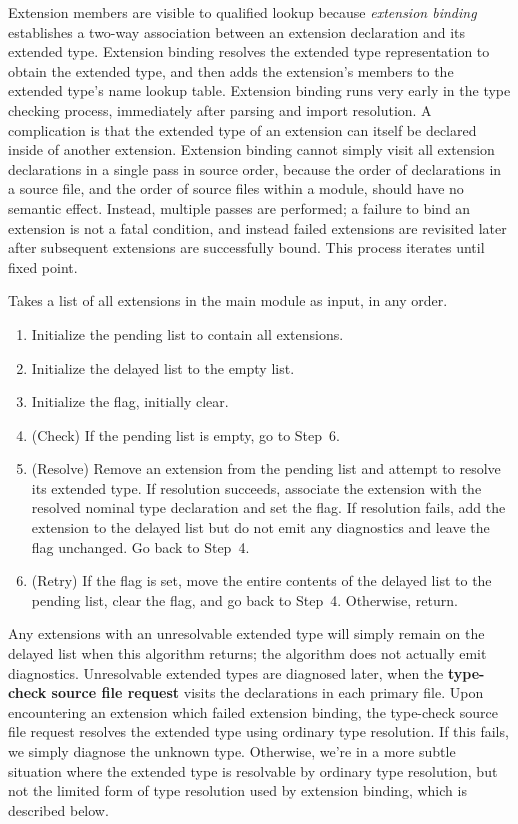 \documentclass[../generics]{subfiles}
\begin{document}
%
%
%
Extension members are visible to qualified lookup because \emph{extension binding} establishes a two-way association between an extension declaration and its extended type. Extension binding resolves the extended type representation to obtain the extended type, and then adds the extension's members to the extended type's name lookup table. Extension binding runs very early in the type checking process, immediately after parsing and import resolution. A complication is that the extended type of an extension can itself be declared inside of another extension. Extension binding cannot simply visit all extension declarations in a single pass in source order, because the order of declarations in a source file, and the order of source files within a module, should have no semantic effect. Instead, multiple passes are performed; a failure to bind an extension is not a fatal condition, and instead failed extensions are revisited later after subsequent extensions are successfully bound. This process iterates until fixed point.
\begin{algorithm}\label{extension binding algorithm}
Takes a list of all extensions in the main module as input, in any order.
\begin{enumerate}
\item Initialize the pending list to contain all extensions.
\item Initialize the delayed list to the empty list.
\item Initialize the flag, initially clear.
\item (Check) If the pending list is empty, go to Step~6.
\item (Resolve) Remove an extension from the pending list and attempt to resolve its extended type. If resolution succeeds, associate the extension with the resolved nominal type declaration and set the flag. If resolution fails, add the extension to the delayed list but do not emit any diagnostics and leave the flag unchanged. Go back to Step~4.
\item (Retry) If the flag is set, move the entire contents of the delayed list to the pending list, clear the flag, and go back to Step~4. Otherwise, return.
\end{enumerate}
\end{algorithm}
Any extensions with an unresolvable extended type will simply remain on the delayed list when this algorithm returns; the algorithm does not actually emit diagnostics. Unresolvable extended types are diagnosed later, when the \textbf{type-check source file request} visits the declarations in each primary file. Upon encountering an extension which failed extension binding, the type-check source file request resolves the extended type using ordinary type resolution. If this fails, we simply diagnose the unknown type. Otherwise, we're in a more subtle situation where the extended type is resolvable by ordinary type resolution, but not the limited form of type resolution used by extension binding, which is described below.
\end{document}
